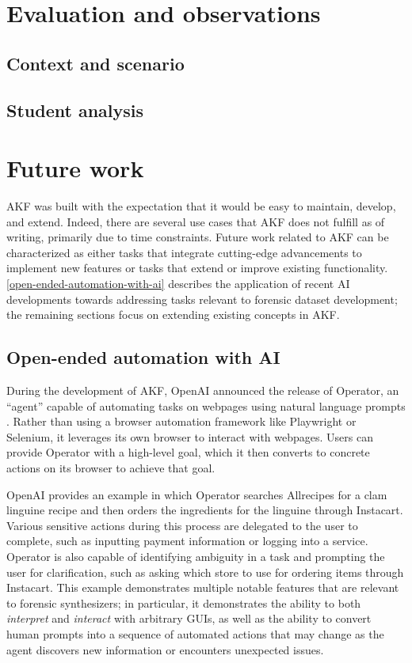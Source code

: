 \documentclass[letterpaper,12pt]{report}
\begin{document}
\chapter{Evaluation and observations}\label{chapter-seven}

\section{Context and scenario}\label{context-and-scenario}

\section{Student analysis}\label{student-analysis}

\chapter{Future work}\label{chapter-eight}

AKF was built with the expectation that it would be easy to maintain,
develop, and extend. Indeed, there are several use cases that AKF does
not fulfill as of writing, primarily due to time constraints. Future
work related to AKF can be characterized as either tasks that integrate
cutting-edge advancements to implement new features or tasks that extend
or improve existing functionality. \autoref{open-ended-automation-with-ai} describes the application of recent AI
developments towards addressing tasks relevant to forensic dataset
development; the remaining sections focus on extending existing concepts
in AKF.

\section{Open-ended automation with
AI}\label{open-ended-automation-with-ai}

During the development of AKF, OpenAI announced the release of Operator,
an ``agent'' capable of automating tasks on webpages using natural
language prompts \cite{openaiIntroducingOperator2025}. Rather than
using a browser automation framework like Playwright or Selenium, it
leverages its own browser to interact with webpages. Users can provide
Operator with a high-level goal, which it then converts to concrete
actions on its browser to achieve that goal.

OpenAI provides an example in which Operator searches Allrecipes for a
clam linguine recipe and then orders the ingredients for the linguine
through Instacart. Various sensitive actions during this process are
delegated to the user to complete, such as inputting payment information
or logging into a service. Operator is also capable of identifying
ambiguity in a task and prompting the user for clarification, such as
asking which store to use for ordering items through Instacart. This
example demonstrates multiple notable features that are relevant to
forensic synthesizers; in particular, it demonstrates the ability to
both \emph{interpret} and \emph{interact} with arbitrary GUIs, as well
as the ability to convert human prompts into a sequence of automated
actions that may change as the agent discovers new information or
encounters unexpected issues.
\end{document}
